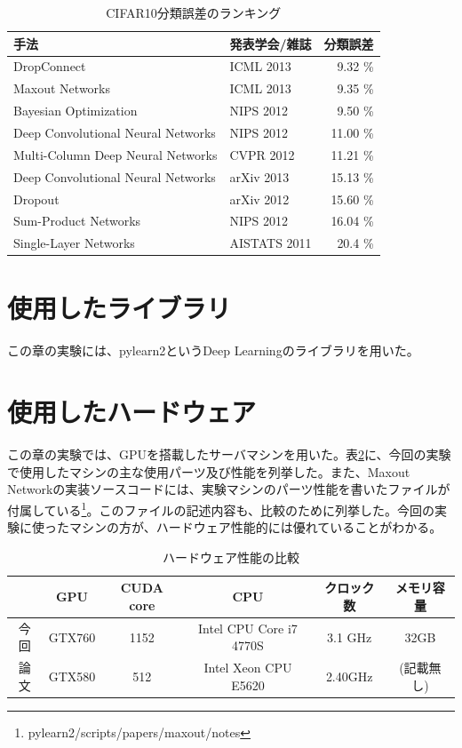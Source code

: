 \begin{table}[tbp]
 \begin{center}
  \begin{tabular}{|l|l|r|}\hline
  手法 & 発表学会/雑誌 & 分類誤差 \\ \hline
DropConnect \cite{wan2013regularization}& ICML 2013 & 9.32 \% \\ \hline
Maxout Networks \cite{goodfellow2013maxout}& ICML 2013 & 9.35 \% \\ \hline
Bayesian Optimization \cite{snoek2012practical}& NIPS 2012 & 9.50 \% \\ \hline
Deep Convolutional Neural Networks \cite{krizhevsky2012imagenet}& NIPS 2012 & 11.00 \% \\ \hline
Multi-Column Deep Neural Networks \cite{ciresan2012multi-column}& CVPR 2012 & 11.21 \% \\ \hline
Deep Convolutional Neural Networks \cite{zeiler2013stochastic}& arXiv 2013 & 15.13 \% \\ \hline
Dropout \cite{hinton2012improving}& arXiv 2012 & 15.60 \% \\ \hline
Sum-Product Networks \cite{gens2012discriminative}& NIPS 2012 & 16.04 \% \\ \hline
Single-Layer Networks \cite{coates2011an-analysis}& AISTATS 2011 & 20.4 \% \\ \hline
  \end{tabular}
 \end{center}
 \caption{CIFAR10分類誤差のランキング}
 \label{c5_cifar_rank}
\end{table}

\section{使用したライブラリ}
この章の実験には、pylearn2というDeep Learningのライブラリを用いた。
\section{使用したハードウェア}
この章の実験では、GPUを搭載したサーバマシンを用いた。表\ref{c5_hardware_spec}に、今回の実験で使用したマシンの主な使用パーツ及び性能を列挙した。また、Maxout Networkの実装ソースコードには、実験マシンのパーツ性能を書いたファイルが付属している\footnote{pylearn2/scripts/papers/maxout/notes}。このファイルの記述内容も、比較のために列挙した。今回の実験に使ったマシンの方が、ハードウェア性能的には優れていることがわかる。
\begin{table}[tbp]
 \begin{center}
  \begin{tabular}{|c|c|c|c|c|c|}\hline
   & GPU & CUDA core & CPU & クロック数 & メモリ容量\\ \hline
今回 & GTX760 & 1152 & Intel CPU Core i7 4770S & 3.1 GHz & 32GB\\ \hline
論文 & GTX580 & 512 & Intel Xeon CPU E5620 &  2.40GHz & (記載無し)\\ \hline
  \end{tabular}
 \end{center}
 \caption{ハードウェア性能の比較}
 \label{c5_hardware_spec}
\end{table}

